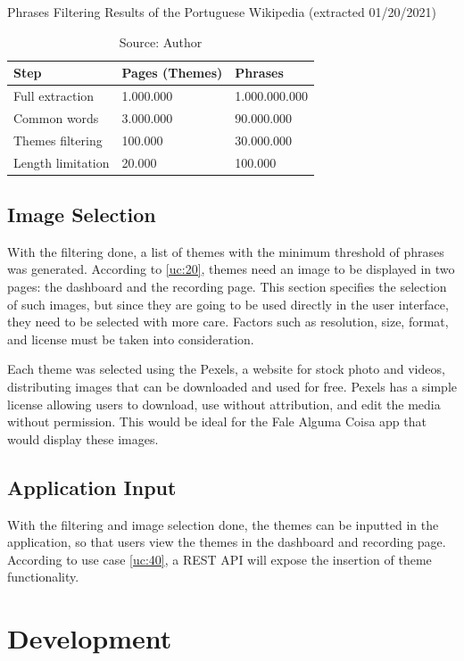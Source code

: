 \begin{table}[h]
    \centering
    \caption{Phrases Filtering Results of the Portuguese Wikipedia (extracted 01/20/2021)}
    \label{tab:filtering}
    \begin{tabular}{|p{5cm}|p{3cm}|p{3cm}|}
        \hline Step & Pages (Themes) & Phrases \\ \hline
        Full extraction & 1.000.000 & 1.000.000.000 \\ \hline
        Common words & 3.000.000 & 90.000.000 \\ \hline
        Themes filtering & 100.000 & 30.000.000 \\ \hline
        Length limitation & 20.000 & 100.000 \\ \hline
    \end{tabular}
    \caption*{Source: Author}
\end{table}

\subsection{Image Selection}

With the filtering done, a list of themes with the minimum threshold of phrases was generated. According to \ref{uc:20}, themes need an image to be displayed in two pages: the dashboard and the recording page. This section specifies the selection of such images, but since they are going to be used directly in the user interface, they need to be selected with more care. Factors such as resolution, size, format, and license must be taken into consideration.

Each theme was selected using the Pexels, a website for stock photo and videos, distributing images that can be downloaded and used for free. Pexels has a simple license allowing users to download, use without attribution, and edit the media without permission. This would be ideal for the Fale Alguma Coisa app that would display these images.

\subsection{Application Input}

With the filtering and image selection done, the themes can be inputted in the application, so that users view the themes in the dashboard and recording page. According to use case \ref{uc:40}, a REST API will expose the insertion of theme functionality.  

\section{Development}
\label{sec:app-development}

